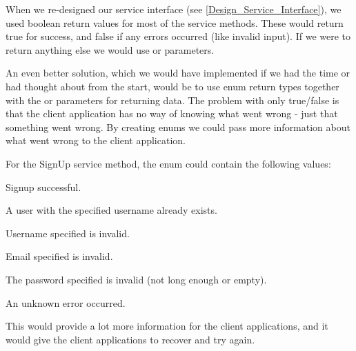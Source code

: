When we re-designed our service interface (see \ref{Design_Service_Interface}), we used boolean return values for most of the service methods. These would return true for success, and false if any errors occurred (like invalid input). If we were to return anything else we would use  or  parameters.

An even better solution, which we would have implemented if we had the time or had thought about from the start, would be to use enum return types together with the  or  parameters for returning data. The problem with only true/false is that the client application has no way of knowing what went wrong - just that something went wrong. By creating enums we could pass more information about what went wrong to the client application.

For the SignUp service method, the enum could contain the following values:

\begin{my_description}
\item[Success] Signup successful.
\item[UsernameInUse] A user with the specified username already exists.
\item[InvalidUsername] Username specified is invalid.
\item[InvalidEmail] Email specified is invalid.
\item[InvalidPassword] The password specified is invalid (not long enough or empty).
\item[Error] An unknown error occurred.
\end{my_description}

This would provide a lot more information for the client applications, and it would give the client applications to recover and try again.